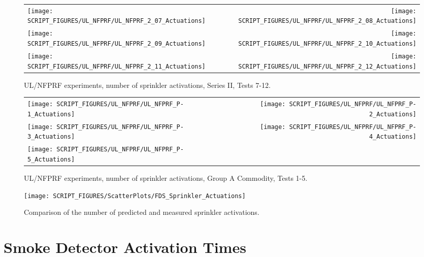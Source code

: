 \begin{figure}[p]
\begin{tabular*}{\textwidth}{l@{\extracolsep{\fill}}r}
\texttt{[image: SCRIPT\_FIGURES/UL\_NFPRF/UL\_NFPRF\_2\_07\_Actuations]} &
\texttt{[image: SCRIPT\_FIGURES/UL\_NFPRF/UL\_NFPRF\_2\_08\_Actuations]} \\
\texttt{[image: SCRIPT\_FIGURES/UL\_NFPRF/UL\_NFPRF\_2\_09\_Actuations]} &
\texttt{[image: SCRIPT\_FIGURES/UL\_NFPRF/UL\_NFPRF\_2\_10\_Actuations]} \\
\texttt{[image: SCRIPT\_FIGURES/UL\_NFPRF/UL\_NFPRF\_2\_11\_Actuations]} &
\texttt{[image: SCRIPT\_FIGURES/UL\_NFPRF/UL\_NFPRF\_2\_12\_Actuations]}
\end{tabular*}
\caption{UL/NFPRF experiments, number of sprinkler activations, Series II, Tests 7-12.}
\label{UL_NFPRF_2_2}
\end{figure}

\begin{figure}[p]
\begin{tabular*}{\textwidth}{l@{\extracolsep{\fill}}r}
\texttt{[image: SCRIPT\_FIGURES/UL\_NFPRF/UL\_NFPRF\_P-1\_Actuations]} &
\texttt{[image: SCRIPT\_FIGURES/UL\_NFPRF/UL\_NFPRF\_P-2\_Actuations]} \\
\texttt{[image: SCRIPT\_FIGURES/UL\_NFPRF/UL\_NFPRF\_P-3\_Actuations]} &
\texttt{[image: SCRIPT\_FIGURES/UL\_NFPRF/UL\_NFPRF\_P-4\_Actuations]} \\
\texttt{[image: SCRIPT\_FIGURES/UL\_NFPRF/UL\_NFPRF\_P-5\_Actuations]} &
\end{tabular*}
\caption{UL/NFPRF experiments, number of sprinkler activations, Group A Commodity, Tests 1-5.}
\label{UL_NFPRF_3_1}
\end{figure}

\begin{figure}[p]
\begin{center}
\texttt{[image: SCRIPT\_FIGURES/ScatterPlots/FDS\_Sprinkler\_Actuations]}
\end{center}
\caption[Comparison of the number of predicted and measured sprinkler activations]
{Comparison of the number of predicted and measured sprinkler activations.}
\label{UL_NFPRF}
\end{figure}




\clearpage

\section{Smoke Detector Activation Times}
\label{Smoke Detector Activation Time}
\label{Smoke Detector Activation Time, Temp. Rise}

